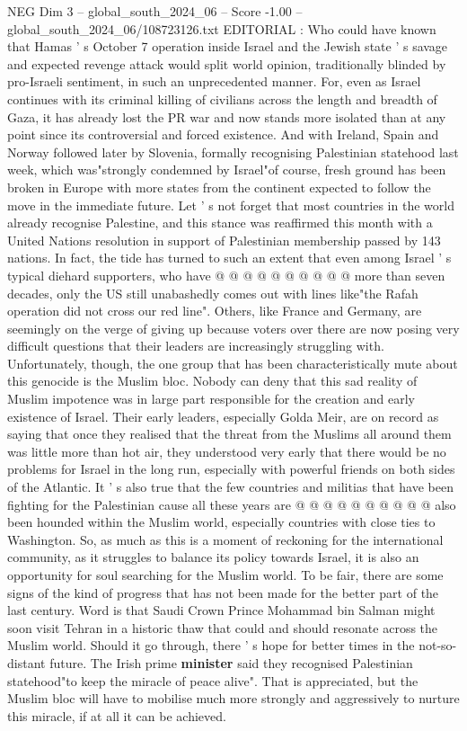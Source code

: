 \begin{textsample}{NEG Dim 3 – global\_south\_2024\_06 – Score -1.00 – global\_south\_2024\_06/108723126.txt}  \label{ex:f3_neg_114}
EDITORIAL : Who could have known that Hamas ' s October 7 operation inside Israel and the Jewish state ' s savage and expected revenge attack would split world opinion, traditionally blinded by pro-Israeli sentiment, in such an unprecedented manner.
For, even as Israel continues with its criminal killing of civilians across the length and breadth of Gaza, it has already lost the PR war and now stands more isolated than at any point since its controversial and forced existence.
And with Ireland, Spain and Norway followed later by Slovenia, formally recognising Palestinian statehood last week, which was"strongly condemned by Israel"of course, fresh ground has been broken in Europe with more states from the continent expected to follow the move in the immediate future.
Let ' s not forget that most countries in the world already recognise Palestine, and this stance was reaffirmed this month with a United Nations resolution in support of Palestinian membership passed by 143 nations.
In fact, the tide has turned to such an extent that even among Israel ' s typical diehard supporters, who have @ @ @ @ @ @ @ @ @ @ more than seven decades, only the US still unabashedly comes out with lines like"the Rafah operation did not cross our red line".
Others, like France and Germany, are seemingly on the verge of giving up because voters over there are now posing very difficult questions that their leaders are increasingly struggling with.
Unfortunately, though, the one group that has been characteristically mute about this genocide is the Muslim bloc.
Nobody can deny that this sad reality of Muslim impotence was in large part responsible for the creation and early existence of Israel.
Their early leaders, especially Golda Meir, are on record as saying that once they realised that the threat from the Muslims all around them was little more than hot air, they understood very early that there would be no problems for Israel in the long run, especially with powerful friends on both sides of the Atlantic.
It ' s also true that the few countries and militias that have been fighting for the Palestinian cause all these years are @ @ @ @ @ @ @ @ @ @ also been hounded within the Muslim world, especially countries with close ties to Washington.
So, as much as this is a moment of reckoning for the international community, as it struggles to balance its policy towards Israel, it is also an opportunity for soul searching for the Muslim world.
To be fair, there are some signs of the kind of progress that has not been made for the better part of the last century.
Word is that Saudi Crown Prince Mohammad bin Salman might soon visit Tehran in a historic thaw that could and should resonate across the Muslim world.
Should it go through, there ' s hope for better times in the not-so-distant future.
The Irish prime \textbf{minister} said they recognised Palestinian statehood"to keep the miracle of peace alive".
That is appreciated, but the Muslim bloc will have to mobilise much more strongly and aggressively to nurture this miracle, if at all it can be achieved.

\end{textsample}
